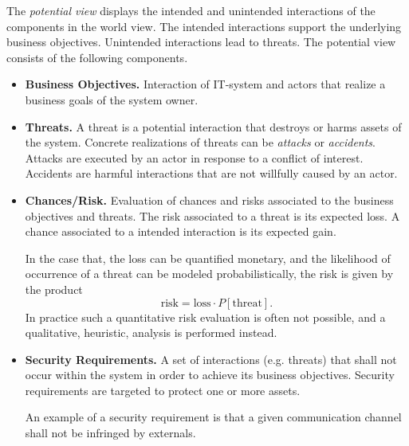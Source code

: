 The \emph{potential view} displays the intended and unintended interactions of the components in the world view.
The intended interactions support the underlying business objectives.
Unintended interactions lead to threats.
The potential view consists of the following components.
\begin{itemize}
\item \textbf{Business Objectives.}
Interaction of IT-system and actors that realize a business goals of the system owner.

\item \textbf{Threats.}
A threat is a potential interaction that destroys or harms assets of the system.
Concrete realizations of threats can be \emph{attacks} or \emph{accidents}.
Attacks are executed by an actor in response to a conflict of interest.
Accidents are harmful interactions that are not willfully caused by an actor.

\item \textbf{Chances/Risk.}
Evaluation of chances and risks associated to the business objectives and threats.
The risk associated to a threat is its expected loss.
A chance associated to a intended interaction is its expected gain.

In the case that, the loss can be quantified monetary, and the likelihood of occurrence of a threat can
be modeled probabilistically, the risk is given by the product
\[ \text{risk} = \text{loss} \cdot P[\text{threat}]. \]
In practice such a quantitative risk evaluation is often not possible, and a qualitative, heuristic, analysis is performed instead.

\item \textbf{Security Requirements.}
A set of interactions (e.g. threats) that shall not occur within the system in order to achieve its business objectives.
Security requirements are targeted to protect one or more assets.

An example of a security requirement is that a given communication channel shall not be infringed by externals.
\end{itemize}




